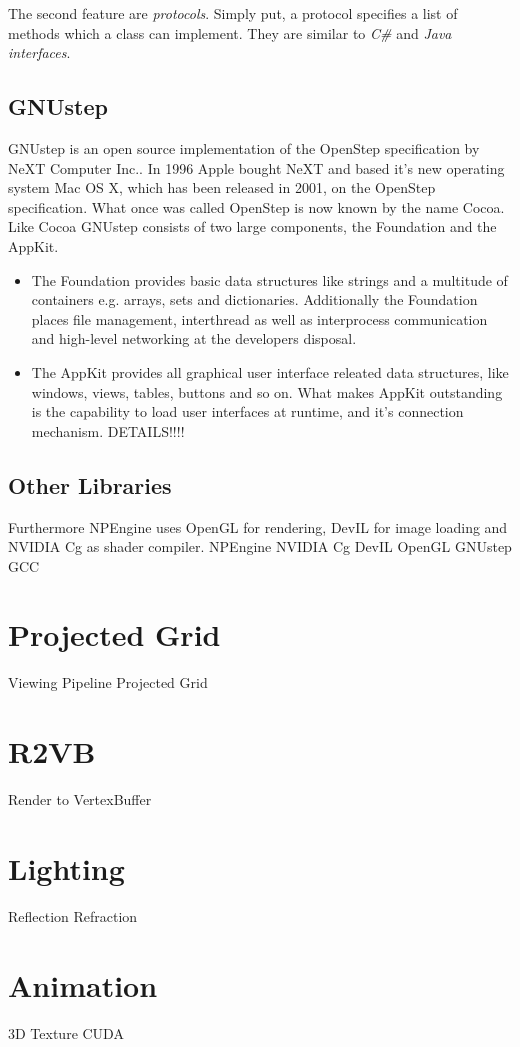 The second feature are \textit{protocols}. Simply put, a protocol specifies a
list of methods which a class can implement. They are similar to \textit{C\#}
and \textit{Java} \textit{interfaces}.




\subsection{GNUstep}
GNUstep is an open source implementation of the OpenStep
specification\cite{misc:OpenStepSpec} by NeXT Computer Inc.\cite{misc:NeXT}. In
1996 Apple bought NeXT and based it's new operating system Mac OS X, which has
been released in 2001, on the OpenStep specification. What once was called
OpenStep is now known by the name Cocoa. Like Cocoa GNUstep consists of two
large components, the Foundation and the AppKit.

\begin{itemize}

\item The Foundation provides basic data structures like strings and a multitude
of containers e.g. arrays, sets and dictionaries. Additionally the Foundation
places file management, interthread as well as interprocess communication and
high-level networking at the developers disposal.

\item The AppKit provides all graphical user interface releated data
structures, like windows, views, tables, buttons and so on. What makes AppKit
outstanding is the capability to load user interfaces at runtime, and it's
connection mechanism. DETAILS!!!!

\end{itemize}

\subsection{Other Libraries}

Furthermore NPEngine uses OpenGL for rendering, DevIL for image loading and
NVIDIA Cg as shader compiler.
NPEngine
NVIDIA Cg
DevIL
OpenGL
GNUstep
GCC

\section{Projected Grid}
Viewing Pipeline
Projected Grid

\section{R2VB}
Render to VertexBuffer

\section{Lighting}
Reflection
Refraction

\section{Animation}
3D Texture
CUDA
